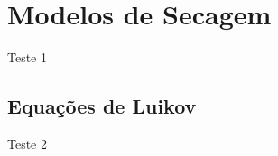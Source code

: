 \section{Modelos de Secagem}\label{modelos}
Teste 1

    \subsection{Equações de Luikov}
    Teste 2 

    